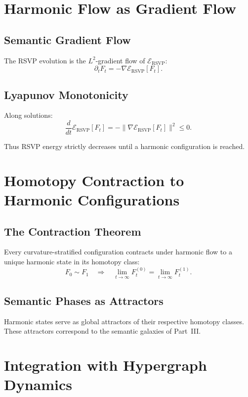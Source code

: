 \section{Harmonic Flow as Gradient Flow}

\subsection{Semantic Gradient Flow}

The RSVP evolution is the $L^2$-gradient flow of $\mathcal{E}_{\mathrm{RSVP}}$:
\[
\partial_t F_t = -\nabla\mathcal{E}_{\mathrm{RSVP}}[F_t].
\]

\subsection{Lyapunov Monotonicity}

Along solutions:
\[
\frac{d}{dt}\mathcal{E}_{\mathrm{RSVP}}[F_t]
=
- \bigl\|\nabla\mathcal{E}_{\mathrm{RSVP}}[F_t]\bigr\|^2
\le 0.
\]

Thus RSVP energy strictly decreases until a harmonic configuration is reached.

\section{Homotopy Contraction to Harmonic Configurations}

\subsection{The Contraction Theorem}

Every curvature-stratified configuration contracts under harmonic flow to a unique harmonic state in its homotopy class:
\[
F_0 \sim F_1
\quad\Longrightarrow\quad
\lim_{t\to \infty}F_t^{(0)}
=
\lim_{t\to \infty}F_t^{(1)}.
\]

\subsection{Semantic Phases as Attractors}

Harmonic states serve as global attractors of their respective homotopy classes. These attractors correspond to the semantic galaxies of Part~III.

\section{Integration with Hypergraph Dynamics}

